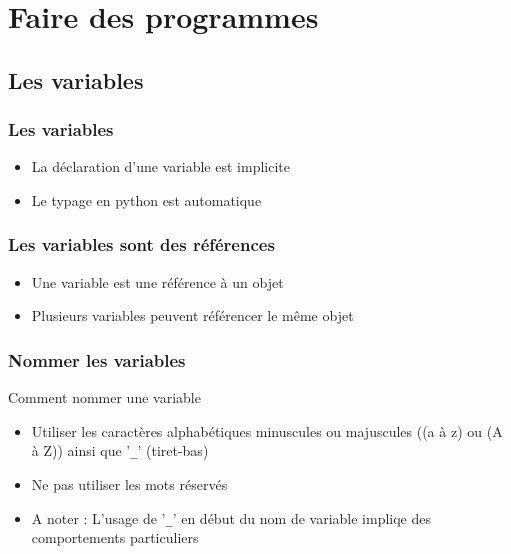 \section{Faire des programmes}

\subsection{Les variables}
\begin{frame}[fragile]
\frametitle{Les variables}
\begin{itemize}
\item La déclaration d'une variable est implicite
\item Le typage en python est automatique
\end{itemize}
\pause
\begin{ipython}
\end{ipython}
\end{frame}

\begin{frame}[fragile]
\frametitle{Les variables sont des références}
\begin{itemize}
\item Une variable est une référence à un objet
\item Plusieurs variables peuvent référencer le même objet
\end{itemize}
\pause
\begin{ipython}
\end{ipython}
\end{frame}

\begin{frame}[fragile]
\frametitle{Nommer les variables}
Comment nommer une variable
\begin{itemize}
\item Utiliser les caractères alphabétiques minuscules ou majuscules ((a à z) ou (A à Z)) ainsi que '\verb=_=' (tiret-bas)
\item Ne pas utiliser les mots réservés
\item A noter : L'usage de '\verb=_=' en début du nom de variable impliqe des comportements particuliers
\end{itemize}
\end{frame}

